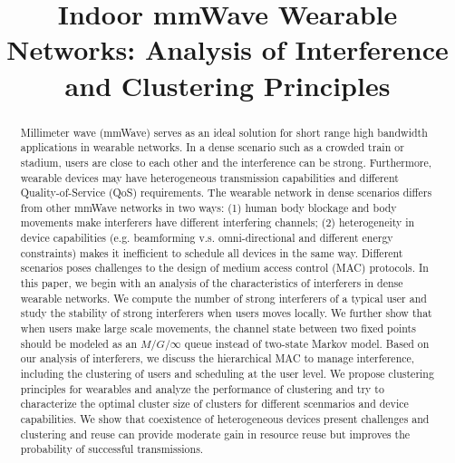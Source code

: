 \documentclass[10pt, conference, letterpaper]{IEEEtran}
\begin{document}
\title{Indoor mmWave Wearable Networks: Analysis of Interference and Clustering Principles}

\author{
}

\maketitle

\begin{abstract}
Millimeter wave (mmWave) serves as an ideal solution for short range high bandwidth applications in wearable networks. In a dense scenario such as a crowded train or stadium, users are close to each other and the interference can be strong. Furthermore, wearable devices may have heterogeneous transmission capabilities and different Quality-of-Service (QoS) requirements. The wearable network in dense scenarios differs from other mmWave networks in two ways: (1) human body blockage and body movements make interferers have different interfering channels; (2) heterogeneity in device capabilities (e.g. beamforming v.s. omni-directional and different energy constraints) makes it inefficient to schedule all devices in the same way. Different scenarios poses challenges to the design of medium access control (MAC) protocols. In this paper, we begin with an analysis of the characteristics of interferers in dense wearable networks. We compute the number of strong interferers of a typical user and study the stability of strong interferers when users moves locally. We further show that when users make large scale movements, the channel state between two fixed points should be modeled as an $M/G/\infty$ queue instead of two-state Markov model. Based on our analysis of interferers, we discuss the hierarchical MAC to manage interference, including the clustering of users and scheduling at the user level. We propose clustering principles for wearables and analyze the performance of clustering and try to characterize the optimal cluster size of clusters for different scenmarios and device capabilities. We show that coexistence of heterogeneous devices present challenges and clustering and reuse can provide moderate gain in resource reuse but improves the probability of successful transmissions. 


\end{abstract}
\IEEEpeerreviewmaketitle
\end{document}
